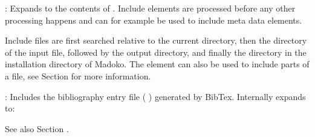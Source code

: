 \documentclass{book}
\begin{document}
\begin{mdUl}[class={list-star,loose},data-line={2027}]
\begin{mdLi}[data-line={2038}]
\begin{mdP}[data-line={2038}]
{}\mdCode[class={code,code1}]{]}%
{}: Expands to the contents of %
{}%
{}. Include elements are
  processed before any other processing happens and can for example be used to
  include meta data elements.%
\end{mdP}%
\begin{mdPre}[class={para-block,pre-fenced},data-line={2041},data-line-code={2042}]%
%
\end{mdPre}%
\begin{mdP}[data-line={2044}]%
{}  Include files are first searched relative to the current directory, then
  the directory of the input file, followed by the output directory, and finally
  the %
{}%
{} directory in the installation directory of Madoko.
{}\mdBr
{}  The %
{}%
{} element can also be used to include parts of a file,
  see Section%
{}{\mdNbsp}%
{} for more information.
{} %
{}%
\end{mdP}%
\end{mdLi}%
\begin{mdLi}[data-line={2051}]%
\begin{mdP}[data-line={2051}]%
{}\mdCode[class={code,code1}]{[BIB]}%
{}: Includes the bibliography entry file (%
{}%
{}) generated by BibTex. Internally
  expands to:%
\end{mdP}%
\begin{mdPre}[class={para-block,pre-fenced},data-line={2053},data-line-code={2054}]%
%
\end{mdPre}%
\begin{mdP}[data-line={2058}]%
{}  See also Section%
{}{\mdNbsp}%
{}.%
\end{mdP}%
\end{mdLi}%
\end{mdUl}%
\end{document}
